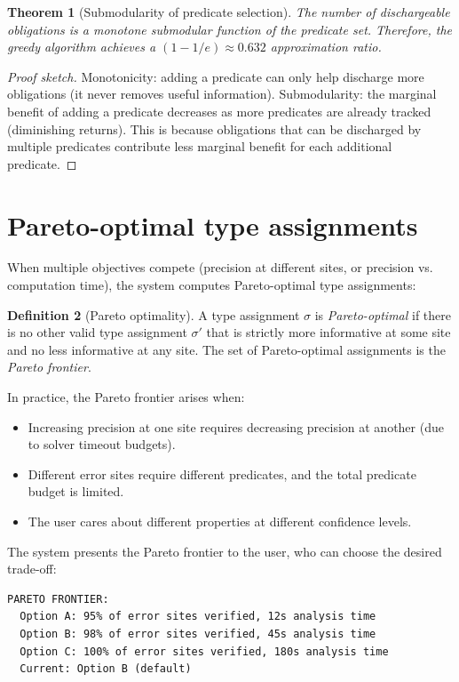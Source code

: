 \documentclass[11pt]{report}
\theoremstyle{definition}
\newtheorem{definition}{Definition}[section]
\theoremstyle{plain}
\newtheorem{theorem}[definition]{Theorem}
\begin{document}
\begin{theorem}[Submodularity of predicate selection]
The number of dischargeable obligations is a monotone submodular function of
the predicate set. Therefore, the greedy algorithm achieves a
$(1 - 1/e) \approx 0.632$ approximation ratio.
\end{theorem}

\begin{proof}[Proof sketch]
Monotonicity: adding a predicate can only help discharge more obligations
(it never removes useful information). Submodularity: the marginal benefit
of adding a predicate decreases as more predicates are already tracked
(diminishing returns). This is because obligations that can be discharged by
multiple predicates contribute less marginal benefit for each additional
predicate.
\end{proof}

\section{Pareto-optimal type assignments}

When multiple objectives compete (precision at different sites, or precision
vs. computation time), the system computes Pareto-optimal type assignments:

\begin{definition}[Pareto optimality]
A type assignment $\sigma$ is \emph{Pareto-optimal} if there is no other
valid type assignment $\sigma'$ that is strictly more informative at some
site and no less informative at any site. The set of Pareto-optimal
assignments is the \emph{Pareto frontier}.
\end{definition}

In practice, the Pareto frontier arises when:
\begin{itemize}[nosep]
  \item Increasing precision at one site requires decreasing precision at
        another (due to solver timeout budgets).
  \item Different error sites require different predicates, and the total
        predicate budget is limited.
  \item The user cares about different properties at different confidence
        levels.
\end{itemize}

The system presents the Pareto frontier to the user, who can choose the
desired trade-off:

\begin{lstlisting}[language={}]
PARETO FRONTIER:
  Option A: 95% of error sites verified, 12s analysis time
  Option B: 98% of error sites verified, 45s analysis time
  Option C: 100% of error sites verified, 180s analysis time
  Current: Option B (default)
\end{lstlisting}
\end{document}
